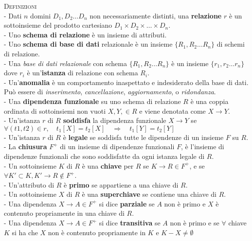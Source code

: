 \documentclass[a4paper,10pt]{article} %
\newcommand{\msection}[1]{%
    {\normalsize \textsc {#1}\\[1ex]}}
\begin{document}
\scriptsize

\msection{Definizioni}
- Dati $n$ domini $D_1, D_2 \ldots D_n$ non necessariamente distinti, una \textbf{relazione} $r$ è un sottoinsieme del prodotto cartesiano $D_1 \times D_2 \times \ldots \times D_n$. \\
- Uno \textbf{schema di relazione} è un insieme di attributi.\\
- Uno \textbf{schema di base di dati} relazionale è un insieme $\{ R_1, R_2 \ldots R_n \}$ di schemi di relazione.\\
- Una \emph{base di dati relazionale} con schema $\{ R_1, R_2 \ldots R_n \}$ è un insieme $\{ r_1, r_2 \ldots r_n \}$ dove $r_i$ è un'\textbf{istanza} di relazione con schema $R_i$.\\
- Un'\textbf{anomalia} è un comportamento inaspettato e indesiderato della base di dati. Può essere di \emph{inserimento}, \emph{cancellazione}, \emph {aggiornamento}, o \emph{ridondanza}. \\
- Una \textbf{dipendenza funzionale} su uno schema di relazione $R$ è una coppia ordinata di sottoinsiemi non vuoti $X, Y, \in R$ e viene denotata come $X \rightarrow Y$. \\
- Un'istanza $r$ di $R$ \textbf{soddisfa} la dipendenza funzionale $X \rightarrow Y$ se \quad $\forall (t1, t2) \in r, \quad t_1[X] = t_2[X] \quad  \Rightarrow \quad t_1[Y] = t_2[Y]$ \\
- Un'istanza $r$ di $R$ è \textbf{legale} se soddisfa tutte le dipendenze di un insieme $F$ su $R$.\\
- La \textbf{chiusura} $F^+$ di un insieme di dipendenze funzionali $F$, è l'insieme di dipendenze funzionali che sono soddisfatte da ogni istanza legale di $R$.\\
- Un sottoinsieme $K$ di $R$ è una \textbf{chiave} per $R$ se $K \rightarrow R \in F^+$, e se $\forall K' \subset K, K' \rightarrow R \notin F^+$.\\
- Un'attributo di $R$ è \textbf{primo} se appartiene a una chiave di $R$.\\
- Un sottoinsieme $X$ di $R$ è una \textbf{superchiave} se contiene una chiave di $R$.\\
- Una dipendenza $X \rightarrow A \in F^+$ si dice \textbf{parziale} se $A$ non è primo e $X$ è contenuto propriamente in una chiave di $R$.\\
- Una dipendenza $X \rightarrow A \in F^+$ si dice \textbf{transitiva} se $A$ non è primo e se $\forall$ chiave $K$ si ha che $X$ non è contenuto propriamente in $K$ e $K - X \neq \emptyset$ \\ 
\end{document}
